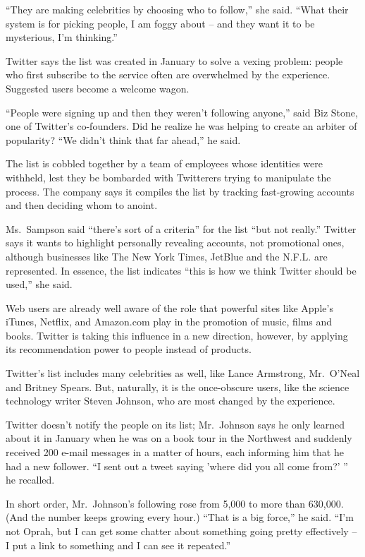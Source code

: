 ﻿\documentclass[12pt,a4paper,onecolumn]{article}
\begin{document}
``They are making celebrities by choosing who to follow,'' she said. ``What their system is for
picking people, I am foggy about -- and they want it to be mysterious, I'm thinking.''

Twitter says the list was created in January to solve a vexing problem: people who first subscribe
to the service often are overwhelmed by the experience. Suggested users become a welcome wagon.

``People were signing up and then they weren't following anyone,'' said Biz Stone, one of Twitter's
co-founders. Did he realize he was helping to create an arbiter of popularity? ``We didn't think
that far ahead,'' he said.

The list is cobbled together by a team of employees whose identities were withheld, lest they be
bombarded with Twitterers trying to manipulate the process. The company says it compiles the list by
tracking fast-growing accounts and then deciding whom to anoint.

Ms.~Sampson said ``there's sort of a criteria'' for the list ``but not really.'' Twitter says it
wants to highlight personally revealing accounts, not promotional ones, although businesses like The
New York Times, JetBlue and the N.F.L. are represented. In essence, the list indicates ``this is how
we think Twitter should be used,'' she said.

Web users are already well aware of the role that powerful sites like Apple's iTunes, Netflix, and
Amazon.com play in the promotion of music, films and books. Twitter is taking this influence in a
new direction, however, by applying its recommendation power to people instead of products.

Twitter's list includes many celebrities as well, like Lance Armstrong, Mr.~O'Neal and Britney
Spears. But, naturally, it is the once-obscure users, like the science technology writer Steven
Johnson, who are most changed by the experience.

Twitter doesn't notify the people on its list; Mr.~Johnson says he only learned about it in January
when he was on a book tour in the Northwest and suddenly received 200 e-mail messages in a matter of
hours, each informing him that he had a new follower. ``I sent out a tweet saying 'where did you all
come from?' '' he recalled.

In short order, Mr.~Johnson's following rose from 5,000 to more than 630,000. (And the number keeps
growing every hour.) ``That is a big force,'' he said. ``I'm not Oprah, but I can get some chatter
about something going pretty effectively -- I put a link to something and I can see it repeated.''
\end{document}
